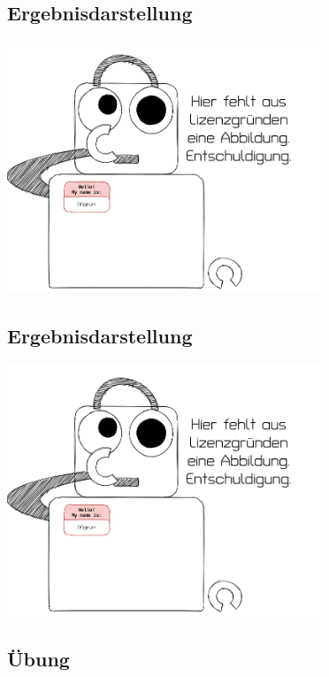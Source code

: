 \documentclass[
]{book}
\begin{document}
\hypertarget{ergebnisdarstellung}{%
\subsection{Ergebnisdarstellung}\label{ergebnisdarstellung}}

\begin{center}\includegraphics[width=266.666666666667pt]{imgs/copyright} \end{center}

\hypertarget{ergebnisdarstellung-1}{%
\subsection{Ergebnisdarstellung}\label{ergebnisdarstellung-1}}

\begin{center}\includegraphics[width=266.666666666667pt]{imgs/copyright} \end{center}

\hypertarget{uxfcbung-2}{%
\subsection{Übung}\label{uxfcbung-2}}
\end{document}

